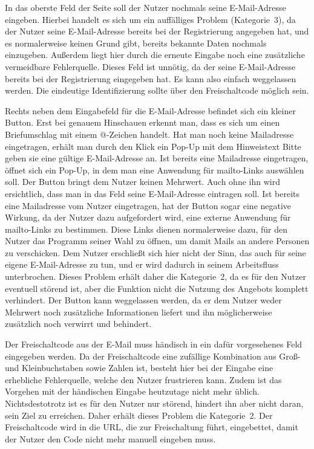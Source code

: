 {
In das oberste Feld der Seite soll der Nutzer nochmals seine E\hbox{-}Mail-Adresse eingeben.
}
{
Hierbei handelt es sich um ein auffälliges Problem (Kategorie~3), da der Nutzer seine E\hbox{-}Mail-Adresse bereits bei der Registrierung angegeben hat, und es normalerweise keinen Grund gibt, bereits bekannte Daten nochmals einzugeben. Außerdem liegt hier durch die erneute Eingabe noch eine zusätzliche vermeidbare Fehlerquelle.
}
{
Dieses Feld ist unnötig, da der seine E\hbox{-}Mail-Adresse bereits bei der Registrierung eingegeben hat. Es kann also einfach weggelassen werden. Die eindeutige Identifizierung sollte über den Freischaltcode möglich sein.
}
\label{prob:frei:emaileingabe}

{
Rechts neben dem Eingabefeld für die E\hbox{-}Mail-Adresse befindet sich ein kleiner Button. Erst bei genauem Hinschauen erkennt man, dass es sich um einen Briefumschlag mit einem @-Zeichen handelt. Hat man noch keine Mailadresse eingetragen, erhält man durch den Klick ein Pop-Up mit dem Hinweistext \glqq Bitte geben sie eine gültige E\hbox{-}Mail-Adresse an\grqq . Ist bereits eine Mailadresse eingetragen, öffnet sich ein Pop-Up, in dem man eine Anwendung für mailto-Links auswählen soll.
}
{
Der Button bringt dem Nutzer keinen Mehrwert. Auch ohne ihn wird ersichtlich, dass man in das Feld seine E\hbox{-}Mail-Adresse eintragen soll. Ist bereits eine Mailadresse vom Nutzer eingetragen, hat der Button sogar eine negative Wirkung, da der Nutzer dazu aufgefordert wird, eine externe Anwendung für mailto-Links zu bestimmen. Diese Links dienen normalerweise dazu, für den Nutzer das Programm seiner Wahl zu öffnen, um damit Mails an andere Personen zu verschicken. Dem Nutzer erschließt sich hier nicht der Sinn, das auch für seine eigene E\hbox{-}Mail-Adresse zu tun, und er wird dadurch in seinem Arbeitsfluss unterbrochen. Dieses Problem erhält daher die Kategorie~2, da es für den Nutzer eventuell störend ist, aber die Funktion nicht die Nutzung des Angebots komplett verhindert.
}
{
Der Button kann weggelassen werden, da er dem Nutzer weder Mehrwert noch zusätzliche Informationen liefert und ihn möglicherweise zusätzlich noch verwirrt und behindert.
}
\label{prob:frei:buttonmailto}

{
Der Freischaltcode aus der E\hbox{-}Mail muss händisch in ein dafür vorgesehenes Feld eingegeben werden.
}
{
Da der Freischaltcode eine zufällige Kombination aus Groß- und Kleinbuchstaben sowie Zahlen ist, besteht hier bei der Eingabe eine erhebliche Fehlerquelle, welche den Nutzer frustrieren kann. Zudem ist das Vorgehen mit der händischen Eingabe heutzutage nicht mehr üblich. Nichtsdestotrotz ist es für den Nutzer nur störend, hindert ihn aber nicht daran, sein Ziel zu erreichen. Daher erhält dieses Problem die Kategorie~2.
}
{
Der Freischaltcode wird in die URL, die zur Freischaltung führt, eingebettet, damit der Nutzer den Code nicht mehr manuell eingeben muss.
}
\label{prob:frei:codeeingabe}

